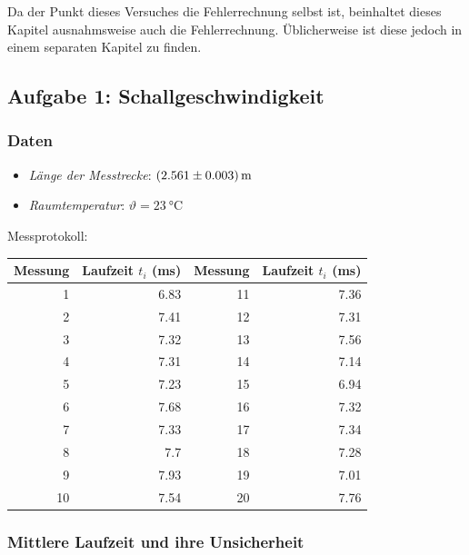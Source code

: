 Da der Punkt dieses Versuches die Fehlerrechnung selbst ist, beinhaltet dieses
Kapitel  ausnahmsweise  auch  die  Fehlerrechnung. \"Ublicherweise  ist  diese
jedoch in einem separaten Kapitel zu finden.

\subsection{Aufgabe 1: Schallgeschwindigkeit}

\subsubsection{Daten}

\begin{itemize}
    \item
        \emph{L\"ange der Messtrecke}: $\SI[separate-uncertainty = true]{2.561 \pm 0.003 }{\meter}$
    \item
        \emph{Raumtemperatur}: $\vartheta = \SI{23}{\celsius}$
\end{itemize}

Messprotokoll:

\begin{center}
\begin{tabular}{rr|rr}
    \toprule
    Messung & Laufzeit $t_i$ (ms) & Messung & Laufzeit $t_i$ (ms) \\
    \midrule
     1       & 6.83  & 11       & 7.36 \\
     2       & 7.41  & 12       & 7.31 \\
     3       & 7.32  & 13       & 7.56 \\
     4       & 7.31  & 14       & 7.14 \\
     5       & 7.23  & 15       & 6.94 \\
     6       & 7.68  & 16       & 7.32 \\
     7       & 7.33  & 17       & 7.34 \\
     8       & 7.7   & 18       & 7.28 \\
     9       & 7.93  & 19       & 7.01 \\
    10       & 7.54  & 20       & 7.76 \\
    \bottomrule
\end{tabular}
\end{center}


\subsubsection{Mittlere Laufzeit und ihre Unsicherheit}

